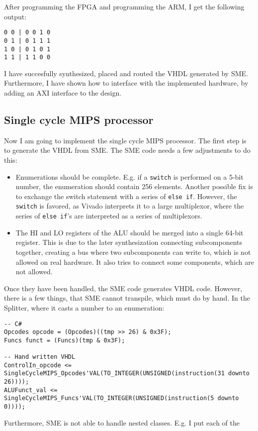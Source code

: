 After programming the FPGA and programming the ARM, I get the following output:
\begin{lstlisting}
0 0 | 0 0 1 0
0 1 | 0 1 1 1
1 0 | 0 1 0 1
1 1 | 1 1 0 0
\end{lstlisting}
I have succesfully synthesized, placed and routed the VHDL generated by SME.
Furthermore, I have shown how to interface with the implemented hardware, by
adding an AXI interface to the design.

\subsection{Single cycle MIPS processor}
Now I am going to implement the single cycle MIPS processor. The first step is to
generate the VHDL from SME. The SME code needs a few adjustments to do this:
\begin{itemize}
    \item Enumerations should be complete. E.g. if a \texttt{switch} is
        performed on a 5-bit number, the enumeration should contain 256
        elements. Another possible fix is to exchange the switch statement with
        a series of \texttt{else if}. However, the \texttt{switch} is favored,
        as Vivado interprets it to a large multiplexor, where the series of
        \texttt{else if}'s are interpreted as a series of multiplexors.

    \item The HI and LO registers of the ALU should be merged into a single 64-bit
        register. This is due to the later synthesization connecting
        subcomponents together, creating a bus where two subcomponents can
        write to, which is not allowed on real hardware. It also tries to connect
        some components, which are not allowed.
\end{itemize}
Once they have been handled, the SME code generates VHDL code. However, there is
a few things, that SME cannot transpile, which must do by hand. In the
Splitter, where it casts a number to an enumeration:
\begin{lstlisting}
-- C#
Opcodes opcode = (Opcodes)((tmp >> 26) & 0x3F);
Funcs funct = (Funcs)(tmp & 0x3F);

-- Hand written VHDL
ControlIn_opcode <= SingleCycleMIPS_Opcodes'VAL(TO_INTEGER(UNSIGNED(instruction(31 downto 26))));
ALUFunct_val <= SingleCycleMIPS_Funcs'VAL(TO_INTEGER(UNSIGNED(instruction(5 downto 0))));
\end{lstlisting}
Furthermore, SME is not able to handle nested classes. E.g. I put each of the
